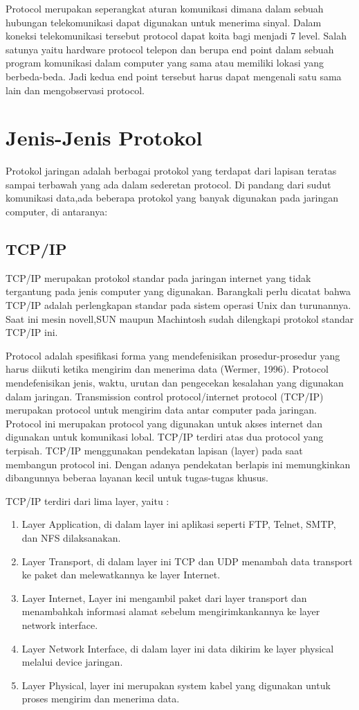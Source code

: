 \documentclass{article}
\begin{document}
Protocol merupakan seperangkat aturan komunikasi dimana dalam sebuah hubungan telekomunikasi dapat digunakan untuk menerima sinyal. 
Dalam  koneksi telekomunikasi tersebut protocol dapat  koita bagi menjadi 7 level. Salah satunya yaitu hardware protocol telepon dan 
berupa end point dalam sebuah program komunikasi dalam computer yang sama atau memiliki lokasi yang berbeda-beda. Jadi kedua end point 
tersebut harus dapat mengenali satu sama lain dan mengobservasi protocol.

 \section{Jenis-Jenis Protokol}
Protokol jaringan adalah berbagai protokol yang terdapat dari lapisan  teratas sampai terbawah yang ada dalam sederetan protocol.
Di pandang dari sudut komunikasi data,ada beberapa protokol yang banyak digunakan pada jaringan computer, di antaranya:

 \subsection{TCP/IP}
TCP/IP merupakan protokol standar pada jaringan internet yang tidak tergantung pada jenis computer yang digunakan.
Barangkali perlu dicatat bahwa TCP/IP adalah perlengkapan standar pada sistem operasi Unix dan turunannya.
Saat ini mesin novell,SUN maupun Machintosh sudah dilengkapi protokol standar TCP/IP ini.

Protocol adalah spesifikasi forma yang mendefenisikan prosedur-prosedur yang harus diikuti ketika mengirim dan menerima data (Wermer, 
1996). Protocol mendefenisikan jenis, waktu, urutan dan pengecekan kesalahan yang digunakan dalam jaringan. Transmission control 
protocol/internet protocol (TCP/IP) merupakan protocol untuk mengirim data antar computer pada jaringan. Protocol ini merupakan protocol 
yang digunakan untuk akses internet dan digunakan untuk komunikasi lobal. TCP/IP terdiri atas dua protocol yang terpisah. TCP/IP 
menggunakan pendekatan lapisan (layer) pada saat membangun protocol ini. Dengan adanya pendekatan berlapis ini memungkinkan dibangunnya 
beberaa layanan kecil untuk tugas-tugas khusus.

TCP/IP terdiri dari lima layer, yaitu :
\begin{enumerate}
\item   Layer Application, di dalam layer ini aplikasi seperti FTP, Telnet, SMTP, dan NFS dilaksanakan.
\item   Layer Transport, di dalam layer ini TCP dan UDP menambah data transport ke paket dan melewatkannya ke layer Internet.
\item    Layer Internet, Layer ini mengambil paket dari layer transport dan menambahkah informasi alamat sebelum mengirimkankannya ke layer network interface.
\item     Layer Network Interface, di dalam layer ini data dikirim ke layer physical melalui device jaringan.
\item     Layer Physical, layer ini merupakan system kabel yang digunakan untuk proses mengirim dan menerima data.
\end{enumerate}
\end{document}
